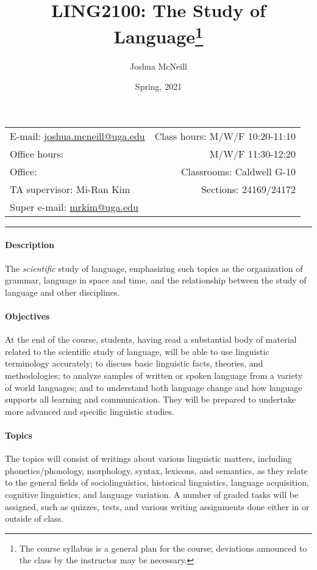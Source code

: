 \documentclass{article}
\title{LING2100: The Study of Language\footnote{The course syllabus is a general plan for the course; deviations announced to the class by the instructor may be necessary.}}
\author{Joshua McNeill}
\date{Spring, 2021}
\begin{document}
  \maketitle

  \begin{center}
    \begin{tabular}{@{} l r @{}}
      E-mail: \url{joshua.mcneill@uga.edu}              & Class hours: M/W/F 10:20-11:10\\
      Office hours:   & M/W/F 11:30-12:20\\
      Office:      & Classrooms: Caldwell G-10\\
      TA supervisor: Mi-Ran Kim                         & Sections: 24169/24172\\
      Super e-mail: \url{mrkim@uga.edu}                 &
    \end{tabular}
  \end{center}

  \hrule

  \paragraph{Description}
    The \emph{scientific} study of language, emphasizing such topics as the organization of grammar, language in space and time, and the relationship between the study of language and other disciplines.

  \paragraph{Objectives}
    At the end of the course, students, having read a substantial body of material related to the scientific study of language, will be able to use linguistic terminology accurately; to discuss basic linguistic facts, theories, and methodologies; to analyze samples of written or spoken language from a variety of world languages; and to understand both language change and how language supports all learning and communication. They will be prepared to undertake more advanced and specific linguistic studies.

  \paragraph{Topics}
    The topics will consist of writings about various linguistic matters, including phonetics/phonology, morphology, syntax, lexicons, and semantics, as they relate to the general fields of sociolinguistics, historical linguistics, language acquisition, cognitive linguistics, and language variation. A number of graded tasks will be assigned, such as quizzes, tests, and various writing assignments done either in or outside of class.
\end{document}
